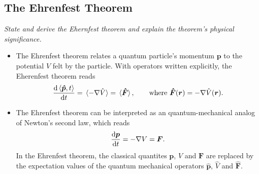 \documentclass[11pt, a4paper]{article}
\renewcommand{\grad}{\nabla}
\renewcommand{\vec}[1]{\bm{#1}}  %
\renewcommand{\r}{\vec{r}}  %
\begin{document}
\subsection{The Ehrenfest Theorem}
\textit{State and derive the Ehernfest theorem and explain the theorem's physical significance.}

\begin{itemize}
    \item The Ehrenfest theorem relates a quantum particle's momentum $ \vec{p} $ to the potential $ V $ felt by the particle. With operators written explicitly, the Eherenfest theorem reads
    \begin{equation*}
        \dv{\ev{\vec{\hat{p}}, t}}{t} = \ev*{- \grad \hat{V}} = \ev*{\vec{\hat{F}}}, \qquad \text{where } \vec{\hat{F}}(\r) = - \grad \hat{V}(\r).
    \end{equation*}

    
     \item The Ehrenfest theorem can be interpreted as an quantum-mechanical analog of Newton's second law, which reads
     \begin{equation*}
         \dv{\vec{p}}{t} = - \grad V = \vec{F}.
     \end{equation*}
     In the Ehrenfest theorem, the classical quantites $ \vec{p} $, $ V $ and $ \vec{F} $ are replaced by the expectation values of the quantum mechanical operators $ \hat{\vec{p}} $, $ \hat{V} $ and $ \hat{\vec{F}} $.
     
\end{itemize}
\end{document}

